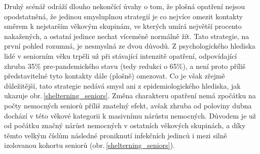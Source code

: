 Druhý scénář odráží dlouho nekončící úvahy o tom, že plošná opatření nejsou opodstatněná, že jedinou smysluplnou strategií je co nejvíce omezit kontakty směrem k nejstarším věkovým skupinám, ve kterých umírá největší procento nakažených, a ostatní jedince nechat víceméně normálně žít. Tato strategie, na první pohled rozumná, je nesmyslná ze dvou důvodů. Z psychologického hlediska lidé v seniorním věku trpěli už při stávající intenzitě opatření, odpovídající zhruba 35\% pre-pandemického stavu (tedy redukci o 65\%), a není proto příliš představitelné tyto kontakty dále (plošně) omezovat. Co je však zřejmě důležitější, tato strategie nedává smysl ani z epidemiologického hlediska, jak ukazuje obr.\,\ref{shelterning_seniors}. Změna charakteru opatření nemá zpočátku na počty nemocných seniorů příliš znatelný efekt, avšak zhruba od poloviny dubna dochází v této věkové kategorii k masivnímu nárůstu nemocných. Důvodem je už od počátku značný nárůst nemocných v ostatních věkových skupinách, a díky těmto velkým číslům následné proniknutí infekčních jedinců i mezi silně izolovanou kohortu seniorů (obr.\,\ref{shelterning_seniors}).

